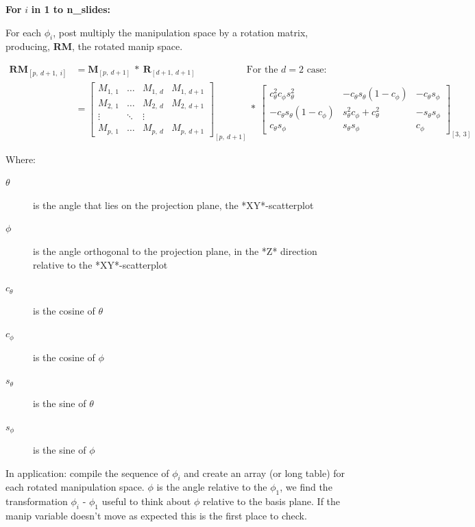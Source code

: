 \documentclass{monashthesis}
\begin{document}
\textbf{For } \(i\) \textbf{in 1 to n\_slides:}

For each \(\phi_i\), post multiply the manipulation space by a rotation
matrix, producing, \textbf{RM}, the rotated manip space.

\begin{align*}
  \textbf{RM}_{[p,~d+1,~i]}
  &= \textbf{M}_{[p,~d+1]} ~*~ \textbf{R}_{[d+1,~d+1]}
    ~~~~~~~~~~~~~~~~~~~~~~~~\text{For the $d=2$ case:} \\
  &= \begin{bmatrix}
    M_{1,~1} & \dots & M_{1,~d} & M_{1,~d+1} \\
    M_{2,~1} & \dots & M_{2,~d} & M_{2,~d+1} \\
    \vdots   & \ddots& \vdots   \\
    M_{p,~1} & \dots & M_{p,~d} & M_{p,~d+1}
  \end{bmatrix}_{[p,~d+1]}
    ~*~
  \begin{bmatrix}
    c_\theta^2 c_\phi s_\theta^2 &
    -c_\theta s_\theta (1 - c_\phi) &
    -c_\theta s_\phi \\
    -c_\theta s_\theta (1 - c_\phi) &
    s_\theta^2 c_\phi + c_\theta^2 &
    -s_\theta s_\phi \\
    c_\theta s_\phi &
    s_\theta s_\phi &
    c_\phi
  \end{bmatrix}_{[3,~3]}
\end{align*}

Where:

\begin{description}
  \item[$\theta$] is the angle that lies on the projection plane, the *XY*-scatterplot
  \item[$\phi$] is the angle orthogonal to the projection plane, in the *Z* direction relative to the *XY*-scatterplot
  \item[$c_\theta$] is the cosine of $\theta$
  \item[$c_\phi$]   is the cosine of $\phi$
  \item[$s_\theta$] is the sine of   $\theta$
  \item[$s_\phi$]   is the sine of   $\phi$
\end{description}

In application: compile the sequence of \(\phi_i\) and create an array
(or long table) for each rotated manipulation space. \(\phi\) is the
angle relative to the \(\phi_1\), we find the transformation \(\phi_i\)
- \(\phi_1\) useful to think about \(\phi\) relative to the basis plane.
If the manip variable doesn't move as expected this is the first place
to check.
\end{document}
